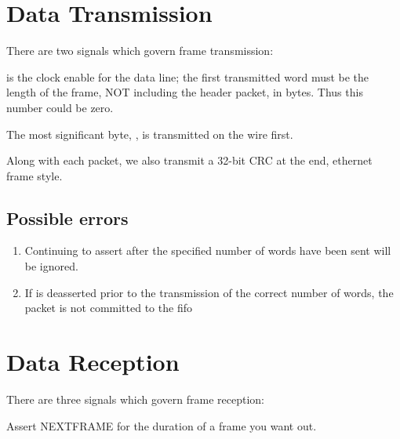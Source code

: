 

\section{Data Transmission}

There are two signals which govern frame transmission: 



 is the clock enable for the data line; the first
transmitted word must be the length of the frame, NOT including the
header packet, in bytes.  Thus this number could be zero.

The most significant byte, , is transmitted on the
wire first.

Along with each packet, we also transmit a 32-bit CRC at the end,
ethernet frame style.

\subsection{Possible errors}
\begin{enumerate}
\item Continuing to assert  after the specified
  number of words have been sent will be ignored.
\item If  is deasserted prior to the transmission of the correct number of words, the packet is not committed to the fifo
\end{enumerate}


\section{Data Reception}

There are three signals which govern frame reception: 


Assert NEXTFRAME for the duration of a frame you want out. 

